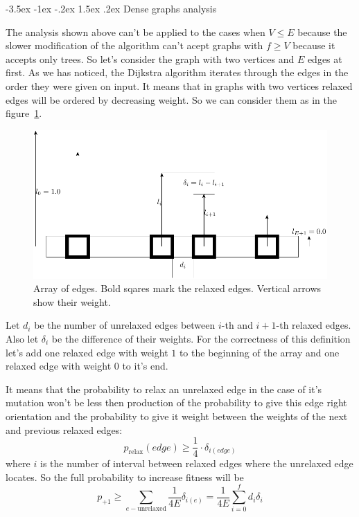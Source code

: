 \documentclass[a4paper,10pt]{article}
\makeatletter
\theoremstyle{definition}
\renewcommand\section{\@startsection {section}{1}{\z@}%
                                   {-3.5ex \@plus -1ex \@minus -.2ex}%
                                   {1.5ex \@plus.2ex}%
                                   {\large\bfseries}}
\makeatother
\begin{document}
\section{Dense graphs analysis}
\label{sec:4}

The analysis shown above can't be applied to the cases when $V \le E$ because the slower modification of the algorithm can't acept graphs with $f \ge V$ because it accepts only trees. So let's consider the graph with two vertices and $E$ edges at first. As we has noticed, the Dijkstra algorithm iterates through the edges in the order they were given on input. It means that in graphs with two vertices relaxed edges will be ordered by decreasing weight. So we can consider them as in the figure~\ref{edges}. 

\begin{figure}[ht]
\label{edges}
\begin{center}
  \includegraphics[width=12cm]{pic/edges.pdf}
  \caption{Array of edges. Bold sqares mark the relaxed edges. Vertical arrows show their weight.}
 \end{center}
\end{figure}

Let $d_i$ be the number of unrelaxed edges between $i$-th and $i + 1$-th relaxed edges. Also let $\delta_i$ be the difference of their weights. For the correctness of this definition let's add one relaxed edge with weight $1$ to the beginning of the array and one relaxed edge with weight $0$ to it's end.

It means that the probability to relax an unrelaxed edge in the case of it's mutation won't be less then production of the probability to give this edge right orientation and the probability to give it weight between the weights of the next and previous relaxed edges:
$$p_\text{relax}(edge) \ge \frac{1}{4} \cdot \delta_{i(edge)}$$
where $i$ is the number of interval between relaxed edges where the unrelaxed edge locates. So the full probability to increase fitness will be
$$p_{+1} \ge \sum_{e - \text{unrelaxed}} \frac{1}{4E} \delta_{i(e)} =  \frac{1}{4E}\sum_{i = 0}^{f} d_i \delta_i$$
\end{document}
